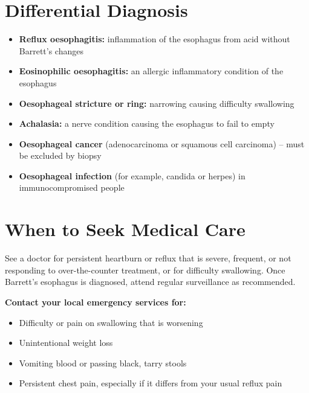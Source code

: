 \section*{Differential Diagnosis}
\begin{itemize}
    \item \textbf{Reflux oesophagitis:} inflammation of the esophagus from acid without Barrett's changes
    \item \textbf{Eosinophilic oesophagitis:} an allergic inflammatory condition of the esophagus
    \item \textbf{Oesophageal stricture or ring:} narrowing causing difficulty swallowing
    \item \textbf{Achalasia:} a nerve condition causing the esophagus to fail to empty
    \item \textbf{Oesophageal cancer} (adenocarcinoma or squamous cell carcinoma) -- must be excluded by biopsy
    \item \textbf{Oesophageal infection} (for example, candida or herpes) in immunocompromised people
\end{itemize}

\section*{When to Seek Medical Care}
See a doctor for persistent heartburn or reflux that is severe, frequent, or not responding to over-the-counter treatment, or for difficulty swallowing. Once Barrett's esophagus is diagnosed, attend regular surveillance as recommended.

\textbf{Contact your local emergency services for:}
\begin{itemize}
    \item Difficulty or pain on swallowing that is worsening
    \item Unintentional weight loss
    \item Vomiting blood or passing black, tarry stools
    \item Persistent chest pain, especially if it differs from your usual reflux pain
\end{itemize}

